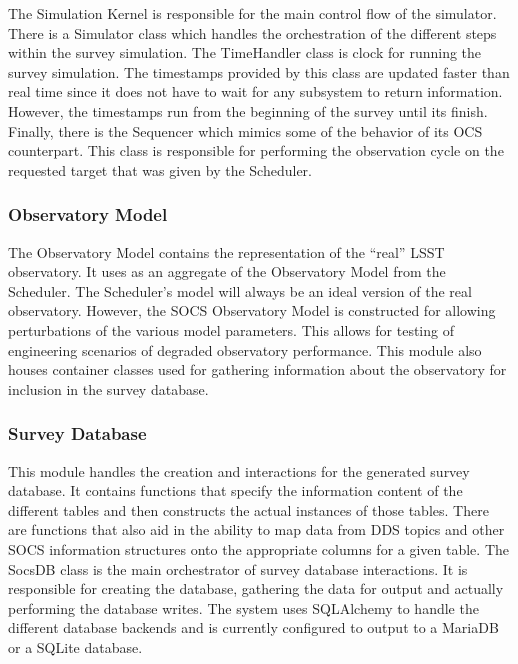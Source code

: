 \documentclass[]{spie}  %
\begin{document}
The Simulation Kernel is responsible for the main control flow of the simulator. There is a Simulator class which handles the orchestration of the different steps within the survey simulation. The TimeHandler class is clock for running the survey simulation. The timestamps provided by this class are updated faster than real time since it does not have to wait for any subsystem to return information. However, the timestamps run from the beginning of the survey until its finish. Finally, there is the Sequencer which mimics some of the behavior of its OCS counterpart. This class is responsible for performing the observation cycle on the requested target that was given by the Scheduler. 

\subsubsection{Observatory Model}

The Observatory Model contains the representation of the ``real'' LSST observatory. It uses as an aggregate of the Observatory Model from the Scheduler. The Scheduler's model will always be an ideal version of the real observatory. However, the SOCS Observatory Model is constructed for allowing perturbations of the various model parameters. This allows for testing of engineering scenarios of degraded observatory performance. This module also houses container classes used for gathering information about the observatory for inclusion in the survey database. 

\subsubsection{Survey Database}

This module handles the creation and interactions for the generated survey database. It contains functions that specify the information content of the different tables and then constructs the actual instances of those tables. There are functions that also aid in the ability to map data from DDS topics and other SOCS information structures onto the appropriate columns for a given table. The SocsDB class is the main orchestrator of survey database interactions. It is responsible for creating the database, gathering the data for output and actually performing the database writes. The system uses SQLAlchemy\cite{SQLAlchemy} to handle the different database backends and is currently configured to output to a MariaDB\cite{MariaDB} or a SQLite\cite{SQLite} database.
\end{document}
